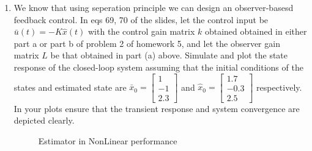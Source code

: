 \begin{enumerate}
  \item We know that using seperation principle we can design an observer-basesd feedback control. In eqs 69, 70
    of the slides, let the control input be $\bar u(t) = -K\hat x(t)$ with the control gain matrix $k$ obtained
    obtained in either part a or part b of problem 2 of homework 5, and let the observer gain matrix $L$ be that
    obtained in part (a) above. Simulate and plot the state response of the closed-loop system assuming that the
    initial conditions of the states and estimated state are
    $\bar x_0 = \begin{bmatrix} 1 \\ -1 \\ 2.3 \end{bmatrix}$ and 
    $\hat x_0 = \begin{bmatrix} 1.7 \\ -0.3 \\ 2.5 \end{bmatrix}$ respectively. In your plots ensure that
    the transient response and system convergence are depicted clearly.
    \begin{figure}[H]
  \begin{center}
  \end{center}
  \caption{Estimator in NonLinear performance}
  \label{fig:estimator-linear}
\end{figure}


\end{enumerate}
